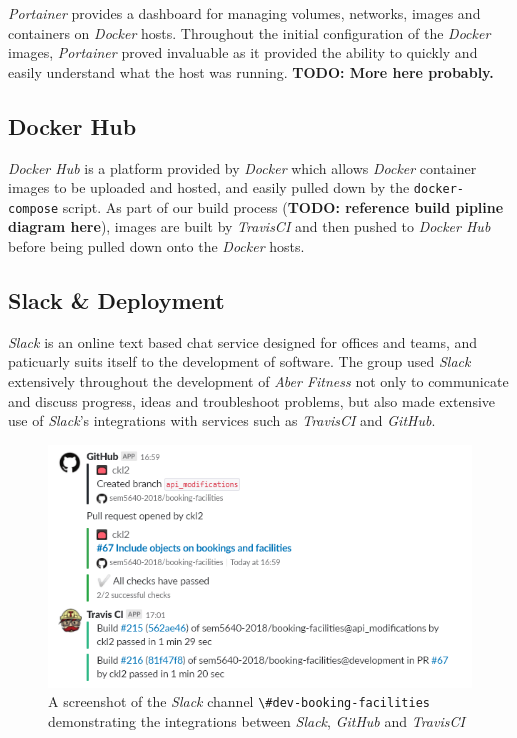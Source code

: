 \textit{Portainer} provides a dashboard for managing volumes, networks, images and containers on \textit{Docker} hosts. Throughout the initial configuration of the \textit{Docker} images, \textit{Portainer} proved invaluable as it provided the ability to quickly and easily understand what the host was running. \textbf{TODO: More here probably.}

\subsection{Docker Hub}
\textit{Docker Hub} is a platform provided by \textit{Docker} which allows \textit{Docker} container images to be uploaded and hosted, and easily pulled down by the \lstinline{docker-compose} script. As part of our build process (\textbf{TODO: reference build pipline diagram here}), images are built by \textit{TravisCI} and then pushed to \textit{Docker Hub} before being pulled down onto the \textit{Docker} hosts.


\subsection{Slack \& Deployment}
\textit{Slack} is an online text based chat service designed for offices and teams, and paticuarly suits itself to the development of software. The group used \textit{Slack} extensively throughout the development of \textit{Aber Fitness} not only to communicate and discuss progress, ideas and troubleshoot problems, but also made extensive use of \textit{Slack}'s integrations with services such as \textit{TravisCI} and \textit{GitHub}. 

\begin{figure}[H]
    \centering
    \includegraphics[width=\textwidth]{Images/Slack_Travis_GitHub.png}
    \caption{A screenshot of the \textit{Slack} channel \lstinline{\#dev-booking-facilities} demonstrating the integrations between \textit{Slack}, \textit{GitHub} and \textit{TravisCI}}
\end{figure}

